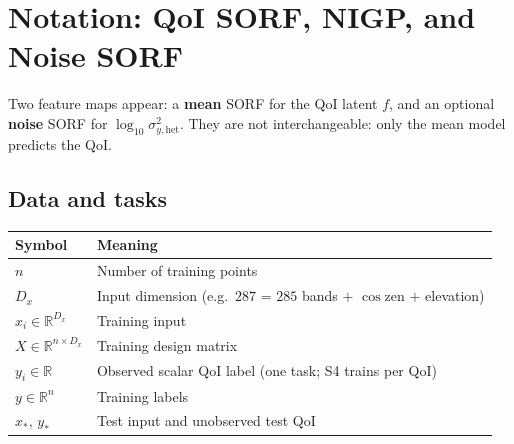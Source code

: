 \documentclass[11pt]{article}
\newcommand{\sighet}{\sigma_{y,\mathrm{het}}^{2}}%
\begin{document}
\section{Notation: QoI SORF, NIGP, and Noise SORF}
\label{sec:notation}

Two feature maps appear: a \textbf{mean} SORF for the QoI latent $f$, and an optional
\textbf{noise} SORF for $\log_{10}\sighet$.
They are not interchangeable: only the mean model predicts the QoI.

\subsection{Data and tasks}
\begin{center}
\small
\begin{tabularx}{\textwidth}{@{}>{\raggedright\arraybackslash}p{}
  >{\raggedright\arraybackslash}X@{}}
\toprule
\textbf{Symbol} & \textbf{Meaning} \\
\midrule
$n$ & Number of training points \\
$D_x$ & Input dimension (e.g.\ $287$ = $285$ bands $+$ $\cos\mathrm{zen}$ $+$ elevation) \\
$x_i\in\mathbb{R}^{D_x}$ & Training input \\
$X\in\mathbb{R}^{n\times D_x}$ & Training design matrix \\
$y_i\in\mathbb{R}$ & Observed scalar QoI label (one task; S4 trains per QoI) \\
$y\in\mathbb{R}^{n}$ & Training labels \\
$x_*$, $y_*$ & Test input and unobserved test QoI \\
\bottomrule
\end{tabularx}
\end{center}
\end{document}
